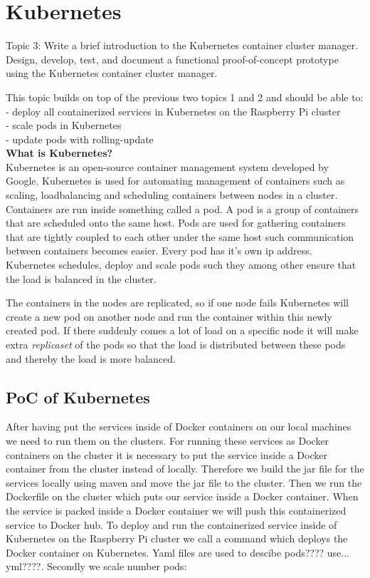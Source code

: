 \chapter{Kubernetes}\label{ch:kubernetes}
Topic 3: Write a brief introduction to the Kubernetes container cluster manager. 
Design, develop, test, and document a functional proof-of-concept prototype using the Kubernetes container cluster manager. 

This topic builds on top of the previous two topics 1 and 2 and should be able to:\\
- deploy all containerized services in Kubernetes on the Raspberry Pi cluster \\
- scale pods in Kubernetes \\
- update pods with rolling-update \\

\textbf{What is Kubernetes?}\\
Kubernetes is an open-source container management system developed by Google.
Kubernetes is used for automating management of containers such as scaling, loadbalancing and scheduling containers between nodes in a cluster. Containers are run inside something called a pod.
A pod is a group of containers that are scheduled onto the same host.
Pods are used for gathering containers that are tightly coupled to each other under the same host such communication between containers becomes easier. Every pod has it's own ip address. Kubernetes schedules, deploy and scale pods such they among other ensure that the load is balanced in the cluster. 

The containers in the nodes are replicated, so if one node fails Kubernetes will create a new pod on another node and run the container within this newly created pod. 
If there suddenly comes a lot of load on a specific node it will make extra \emph{replicaset} of the pods so that the load is distributed between these pods and thereby the load is more balanced. 

\section{PoC of Kubernetes}
After having put the services inside of Docker containers on our local machines we need to run them on the clusters. For running these services as Docker containers on the cluster it is necessary to put the service inside a Docker container from the cluster instead of locally. Therefore we build the jar file for the services locally using maven and move the jar file to the cluster. Then we run the Dockerfile on the cluster which puts our service inside a Docker container. When the service is packed inside a Docker container we will push this containerized service to Docker hub. To deploy and run the containerized service inside of Kubernetes on the Raspberry Pi cluster we call a command which deploys the Docker container on Kubernetes. Yaml files are used to descibe pods???? use... yml????.
Secondly we scale number pods:

